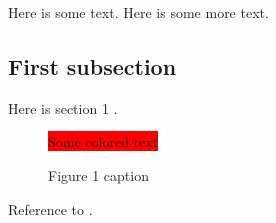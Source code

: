 %
%

%
%


\startdocument			%
%
%

Here is some text.
Here is some more text.

\subsection{First subsection}
Here is section 1 \label{first}.
\begin{figure}
\colorbox{red}{Some colored text}
\caption[List of figure caption]{Figure 1 caption}
\end{figure}

%
%

Reference to .

%
%
